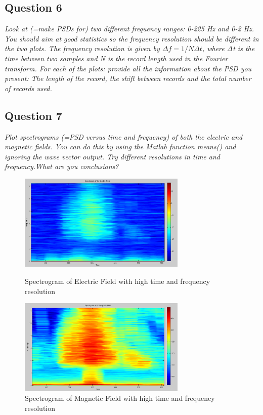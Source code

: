 \documentclass{article}
\begin{document}
\subsection{Question 6}
\textit{Look at (=make PSDs for) two different frequency ranges: 0-225 Hz and 0-2 Hz. You should aim at good statistics so the frequency resolution should be different in the two plots. The frequency resolution is given by $Δf=1/NΔt$, where Δt is the time between two samples and N is the record length used in the Fourier transform. For each of the plots: provide all the information about the PSD you present: The length of the record, the shift between records and the total number of records used.}

\subsection{Question 7}
\textit{Plot spectrograms (=PSD versus time and frequency) of both the electric and magnetic fields. You can do this by using the Matlab function means() and ignoring the wave vector output. Try different resolutions in time and frequency.What are you conclusions?}

\begin{figure}[ht]
\begin{minipage}[c]{0.5\linewidth}
\centering
\includegraphics[width=8cm]{Figures/spectrogram_electricHR.png}
\caption{Spectrogram of Electric Field with high time and frequency resolution}
\label{fig:spectrogram_electricHR}
\end{minipage}
\hspace{0.1cm}
\begin{minipage}[c]{0.5\linewidth}
\centering
\includegraphics[width=8cm]{Figures/spectrogram_magneticHR.png}
\caption{Spectrogram of Magnetic Field with high time and frequency resolution}
\label{fig:spectrogram_magneticHR}
\end{minipage}
\end{figure}
\end{document}
